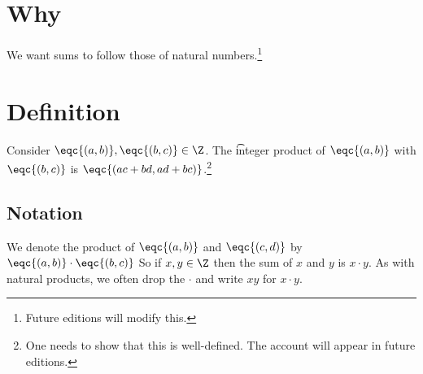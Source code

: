 
\section*{Why}

We want sums to follow those of natural numbers.\footnote{Future editions will modify this.}

\section*{Definition}

Consider $\eqc{(a, b)}, \eqc{(b, c)} \in \Z $.
The \t{integer product} of $\eqc{(a, b)}$ with $\eqc{(b, c)}$ is $\eqc{(ac + bd, ad + bc)}$.\footnote{One needs to show that this is well-defined. The account will appear in future editions.}

\subsection*{Notation}

We denote the product of $\eqc{(a, b)}$ and $\eqc{(c, d)}$ by $\eqc{(a, b)} \cdot  \eqc{(b, c)}$
So if $x, y \in \Z $ then the sum of $x$ and $y$ is $x\cdot y$.
As with natural products, we often drop the $\cdot $ and write $xy$ for $x\cdot y$.

\blankpage